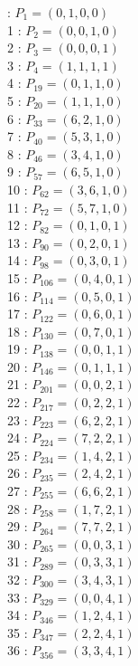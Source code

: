 \documentclass{article}
\begin{document}
{\begin{multicols}{3}
 : $P_{1}=( 0, 1, 0, 0 )$\\
1 : $P_{2}=( 0, 0, 1, 0 )$\\
2 : $P_{3}=( 0, 0, 0, 1 )$\\
3 : $P_{4}=( 1, 1, 1, 1 )$\\
4 : $P_{19}=( 0, 1, 1, 0 )$\\
5 : $P_{20}=( 1, 1, 1, 0 )$\\
6 : $P_{33}=( 6, 2, 1, 0 )$\\
7 : $P_{40}=( 5, 3, 1, 0 )$\\
8 : $P_{46}=( 3, 4, 1, 0 )$\\
9 : $P_{57}=( 6, 5, 1, 0 )$\\
10 : $P_{62}=( 3, 6, 1, 0 )$\\
11 : $P_{72}=( 5, 7, 1, 0 )$\\
12 : $P_{82}=( 0, 1, 0, 1 )$\\
13 : $P_{90}=( 0, 2, 0, 1 )$\\
14 : $P_{98}=( 0, 3, 0, 1 )$\\
15 : $P_{106}=( 0, 4, 0, 1 )$\\
16 : $P_{114}=( 0, 5, 0, 1 )$\\
17 : $P_{122}=( 0, 6, 0, 1 )$\\
18 : $P_{130}=( 0, 7, 0, 1 )$\\
19 : $P_{138}=( 0, 0, 1, 1 )$\\
20 : $P_{146}=( 0, 1, 1, 1 )$\\
21 : $P_{201}=( 0, 0, 2, 1 )$\\
22 : $P_{217}=( 0, 2, 2, 1 )$\\
23 : $P_{223}=( 6, 2, 2, 1 )$\\
24 : $P_{224}=( 7, 2, 2, 1 )$\\
25 : $P_{234}=( 1, 4, 2, 1 )$\\
26 : $P_{235}=( 2, 4, 2, 1 )$\\
27 : $P_{255}=( 6, 6, 2, 1 )$\\
28 : $P_{258}=( 1, 7, 2, 1 )$\\
29 : $P_{264}=( 7, 7, 2, 1 )$\\
30 : $P_{265}=( 0, 0, 3, 1 )$\\
31 : $P_{289}=( 0, 3, 3, 1 )$\\
32 : $P_{300}=( 3, 4, 3, 1 )$\\
33 : $P_{329}=( 0, 0, 4, 1 )$\\
34 : $P_{346}=( 1, 2, 4, 1 )$\\
35 : $P_{347}=( 2, 2, 4, 1 )$\\
36 : $P_{356}=( 3, 3, 4, 1 )$\\

\end{multicols}}
\end{document}
